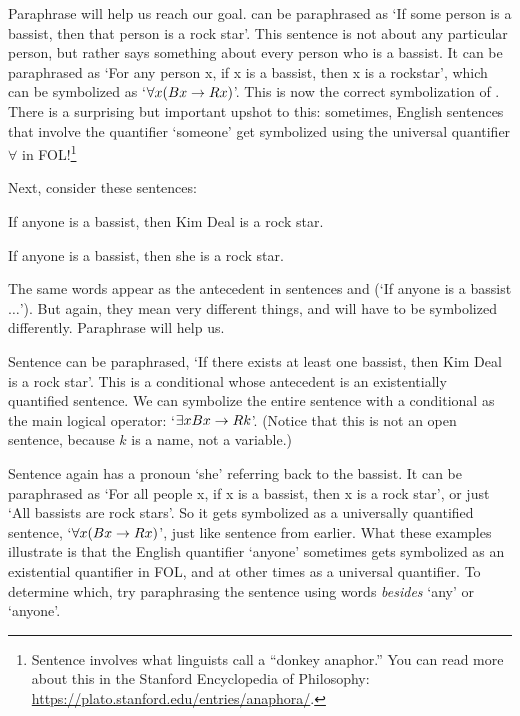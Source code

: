 Paraphrase will help us reach our goal.   can be paraphrased as `If some person is a bassist, then that person is a rock star'. This sentence is not about any particular person, but rather says something about every person who is a bassist.  It can be paraphrased as `For any person x, if x is a bassist, then x is a rockstar', which can be symbolized as `$\forall x (Bx \rightarrow Rx)$'.  This is now the correct symbolization of .  There is a surprising but important upshot to this: sometimes, English sentences that involve the quantifier `someone' get symbolized using the universal quantifier $\forall$ in FOL!\footnote{Sentence  involves what linguists call a ``donkey anaphor.''  You can read more about this in the Stanford Encyclopedia of Philosophy: \href{https://plato.stanford.edu/entries/anaphora/}{https://plato.stanford.edu/entries/anaphora/}.}




Next, consider these sentences:
	\begin{earg}
		\item[\ex{anyone1}] If anyone is a bassist, then Kim Deal is a rock star.
		\item[\ex{anyone2}] If anyone is a bassist, then she is a rock star.
	\end{earg}
The same words appear as the antecedent in sentences  and   (`If anyone is a bassist$\ldots$'). But again, they mean very different things, and will have to be symbolized differently.  Paraphrase will help us.

Sentence  can be paraphrased, `If there exists at least one bassist, then Kim Deal is a rock star'. This is a conditional whose antecedent is an existentially quantified sentence.  We can symbolize the entire sentence with a conditional as the main logical operator: `$\exists x Bx \rightarrow Rk$'.  (Notice that this is not an open sentence, because $k$ is a name, not a variable.)

Sentence  again has a pronoun `she' referring back to the bassist.  It can be paraphrased as `For all people x, if x is a bassist, then x is a rock star', or just `All bassists are rock stars'. So it gets symbolized as a universally quantified sentence, `$\forall x(Bx \rightarrow Rx)$', just like sentence  from earlier.  What these examples illustrate is that the English quantifier `anyone' sometimes gets symbolized as an existential quantifier in FOL, and at other times as a universal quantifier.   To determine which, try paraphrasing the sentence using words \emph{besides} `any' or `anyone'.

